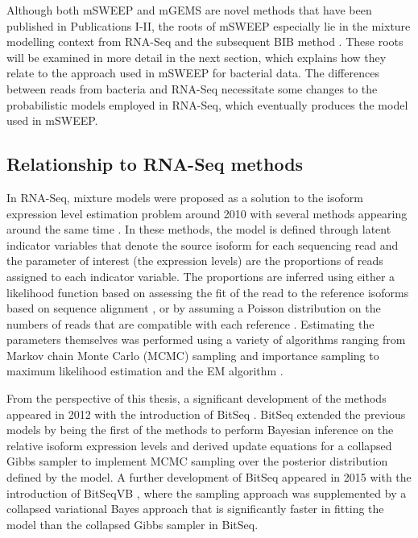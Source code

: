 \documentclass[officiallayout]{tktla}
\begin{document}
Although both mSWEEP and mGEMS are novel methods that have been
published in Publications I-II, the roots of mSWEEP
especially lie in the mixture modelling context from RNA-Seq and the
subsequent BIB method \citep{sankar2016bayesian} . These roots will be
examined in more detail in the next section, which explains how they
relate to the approach used in mSWEEP for bacterial data. The
differences between reads from bacteria and RNA-Seq necessitate some
changes to the probabilistic models employed in RNA-Seq, which
eventually produces the model used in mSWEEP.

\subsection{Relationship to RNA-Seq methods}

In RNA-Seq, mixture models were proposed as a solution to the isoform
expression level estimation problem around 2010 with several methods
appearing around the same time \citep{katz2010analysis, li2010rna,
  jiang2009statistical, wang2010isoform}. In these methods, the model
is defined through latent indicator variables that denote the source
isoform for each sequencing read and the parameter of interest (the
expression levels) are the proportions of reads assigned to each
indicator variable. The proportions are inferred using either a
likelihood function based on assessing the fit of the read to the
reference isoforms based on sequence alignment
\citep{katz2010analysis, li2010rna}, or by assuming a Poisson
distribution on the numbers of reads that are compatible with each
reference \citep{jiang2009statistical, wang2010isoform}. Estimating
the parameters themselves was performed using a variety of algorithms
ranging from Markov chain Monte Carlo (MCMC) sampling
\citep{katz2010analysis} and importance sampling
\citep{jiang2009statistical} to maximum likelihood estimation
\citep{wang2010isoform} and the EM algorithm \citep{li2010rna}.

From the perspective of this thesis, a significant development of the
methods appeared in 2012 with the introduction of BitSeq
\citep{glaus2012identifying}. BitSeq extended the previous models by
being the first of the methods to perform Bayesian inference on the
relative isoform expression levels and derived update equations for a
collapsed Gibbs sampler to implement MCMC sampling
over the posterior distribution defined by the model. A further
development of BitSeq appeared in 2015 with the introduction of
BitSeqVB \citep{hensman2015fast}, where the sampling approach was
supplemented by a collapsed variational Bayes approach that is
significantly faster in fitting the model than the collapsed Gibbs
sampler in BitSeq.
\end{document}
